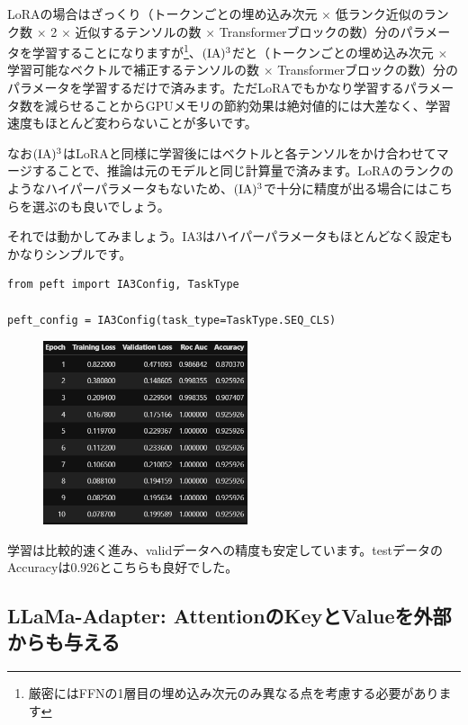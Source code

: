 \documentclass[a5paper,twoside,dvipdfmx]{jsarticle}
\begin{document}
LoRAの場合はざっくり（トークンごとの埋め込み次元 $\times$ 低ランク近似のランク数 $\times$ 2 $\times$ 近似するテンソルの数 $\times$ Transformerブロックの数）分のパラメータを学習することになりますが\footnote{厳密にはFFNの1層目の埋め込み次元のみ異なる点を考慮する必要があります}、$\rm{(IA)^3}$だと（トークンごとの埋め込み次元 $\times$ 学習可能なベクトルで補正するテンソルの数 $\times$ Transformerブロックの数）分のパラメータを学習するだけで済みます。ただLoRAでもかなり学習するパラメータ数を減らせることからGPUメモリの節約効果は絶対値的には大差なく、学習速度もほとんど変わらないことが多いです。

なお$\rm{(IA)^3}$はLoRAと同様に学習後にはベクトルと各テンソルをかけ合わせてマージすることで、推論は元のモデルと同じ計算量で済みます。LoRAのランクのようなハイパーパラメータもないため、$\rm{(IA)^3}$で十分に精度が出る場合にはこちらを選ぶのも良いでしょう。

それでは動かしてみましょう。IA3はハイパーパラメータもほとんどなく設定もかなりシンプルです。

\begin{lstlisting}
from peft import IA3Config, TaskType
 
peft_config = IA3Config(task_type=TaskType.SEQ_CLS)
\end{lstlisting}


\newpage

\begin{figure}[h]
  \centering
  \includegraphics[width=60mm]{../C105Fig/gray/ia3_train.png}
 \end{figure} 

 
学習は比較的速く進み、validデータへの精度も安定しています。testデータのAccuracyは0.926とこちらも良好でした。


\subsection{LLaMa-Adapter: AttentionのKeyとValueを外部からも与える}
\end{document}
